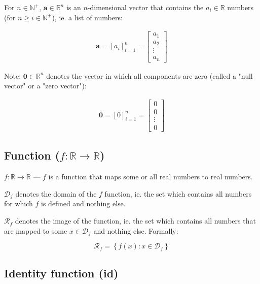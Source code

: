 \documentclass{article}
\begin{document}
        For $n \in \mathbb{N}^+$, $\mathbf{a} \in \mathbb{R}^n$ is an
        $n$-dimensional vector that contains the $a_i \in \mathbb{R}$ numbers
        (for $n \geq i \in \mathbb{N}^+$), ie. a list of numbers:

        \begin{align*}
          \mathbf{a} = \left[ a_i \right]_{i=1}^n
            = \begin{bmatrix}
                a_1 \\
                a_2 \\
                \vdots \\
                a_n
              \end{bmatrix}
        \end{align*}

        Note: $\mathbf{0} \in \mathbb{R}^n$ denotes the vector in which all
        components are zero (called a "null vector" or a "zero vector"):

        \begin{align*}
          \mathbf{0} = \left[ 0 \right]_{i=1}^n
            = \begin{bmatrix}
                0 \\
                0 \\
                \vdots \\
                0
              \end{bmatrix}
        \end{align*}

      \subsection{Function ($f : \mathbb{R} \rightarrow \mathbb{R}$)}

        $f : \mathbb{R} \rightarrow \mathbb{R}$ --- $f$ is a function that
        maps some or all real numbers to real numbers.

        $\mathcal{D}_f$ denotes the domain of the $f$ function, ie. the set
        which contains all numbers for which $f$ is defined and nothing else.

        $\mathcal{R}_f$ denotes the image of the function, ie. the set which
        contains all numbers that are mapped to some $x \in \mathcal{D}_f$ and
        nothing else. Formally:

        $$\mathcal{R}_f = \left\{ f(x) : x \in \mathcal{D}_f\right\}$$

      \subsection{Identity function (id)}
\end{document}
